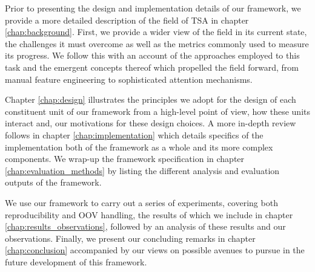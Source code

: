 \documentclass[../../fyp.tex]{subfiles}
\begin{document}
Prior to presenting the design and implementation details of our framework, we provide a more detailed description of the field of TSA in chapter \ref{chap:background}. First, we provide a wider view of the field in its current state, the challenges it must overcome as well as the metrics commonly used to measure its progress. We follow this with an account of the approaches employed to this task and the emergent concepts thereof which propelled the field forward, from manual feature engineering to sophisticated attention mechanisms. 

Chapter \ref{chap:design} illustrates the principles we adopt for the design of each constituent unit of our framework from a high-level point of view, how these units interact and, our motivations for these design choices. A more in-depth review follows in chapter \ref{chap:implementation} which details specifics of the implementation both of the framework as a whole and its more complex components. We wrap-up the framework specification in chapter \ref{chap:evaluation_methods} by listing the different analysis and evaluation outputs of the framework. 

We use our framework to carry out a series of experiments, covering both reproducibility and OOV handling, the results of which we include in chapter \ref{chap:results_observations}, followed by an analysis of these results and our observations. Finally, we present our concluding remarks in chapter \ref{chap:conclusion} accompanied by our views on possible avenues to pursue in the future development of this framework.
\end{document}
